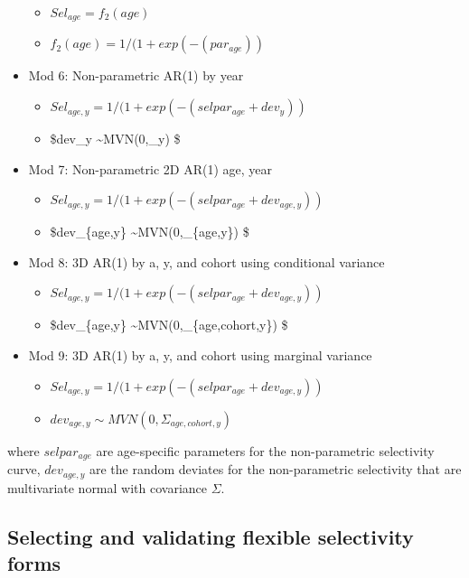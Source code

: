\documentclass[
]{article}
\providecommand{\tightlist}{%
  \setlength{\itemsep}{0pt}\setlength{\parskip}{0pt}}
\begin{document}
\begin{itemize}
  \begin{itemize}
  \tightlist
  \item
    \(Sel_{age}=f_2 (age)\)
  \item
    \(f_2 (age) = 1/(1+exp(-(par_{age}))\)
  \end{itemize}
\item
  Mod 6: Non-parametric AR(1) by year

  \begin{itemize}
  \tightlist
  \item
    \(Sel_{age,y}=1/(1+exp(-(selpar_{age}+dev_y))\)
  \item
    \$dev\_y \sim MVN(0,\Sigma \_y) \$
  \end{itemize}
\item
  Mod 7: Non-parametric 2D AR(1) age, year

  \begin{itemize}
  \tightlist
  \item
    \(Sel_{age,y}=1/(1+exp(-(selpar_{age}+dev_{age,y}))\)
  \item
    \$dev\_\{age,y\} \sim MVN(0,\Sigma \_\{age,y\}) \$
  \end{itemize}
\item
  Mod 8: 3D AR(1) by a, y, and cohort using conditional variance

  \begin{itemize}
  \tightlist
  \item
    \(Sel_{age,y}=1/(1+exp(-(selpar_{age}+dev_{age,y}))\)
  \item
    \$dev\_\{age,y\} \sim MVN(0,\Sigma \_\{age,cohort,y\}) \$
  \end{itemize}
\item
  Mod 9: 3D AR(1) by a, y, and cohort using marginal variance

  \begin{itemize}
  \tightlist
  \item
    \(Sel_{age,y}=1/(1+exp(-(selpar_{age}+dev_{age,y}))\)
  \item
    \(dev_{age,y} \sim MVN(0,\Sigma _{age,cohort,y})\)
  \end{itemize}
\end{itemize}

where \(selpar_{age}\) are age-specific parameters for the
non-parametric selectivity curve, \(dev_{age,y}\) are the random
deviates for the non-parametric selectivity that are multivariate normal
with covariance \(\Sigma\).

\hypertarget{selecting-and-validating-flexible-selectivity-forms}{%
\subsection{Selecting and validating flexible selectivity
forms}\label{selecting-and-validating-flexible-selectivity-forms}}
\end{document}
